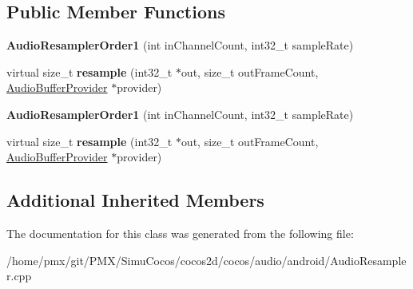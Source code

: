 \subsection*{Public Member Functions}
\begin{DoxyCompactItemize}
\item 
\mbox{\label{classcocos2d_1_1experimental_1_1AudioResamplerOrder1_ac1a9b64c01f4b74e204534d4a13f019b}} 
{\bfseries Audio\+Resampler\+Order1} (int in\+Channel\+Count, int32\+\_\+t sample\+Rate)
\item 
\mbox{\label{classcocos2d_1_1experimental_1_1AudioResamplerOrder1_a0524655e0598880221d63be29004db61}} 
virtual size\+\_\+t {\bfseries resample} (int32\+\_\+t $\ast$out, size\+\_\+t out\+Frame\+Count, \hyperlink{classcocos2d_1_1experimental_1_1AudioBufferProvider}{Audio\+Buffer\+Provider} $\ast$provider)
\item 
\mbox{\label{classcocos2d_1_1experimental_1_1AudioResamplerOrder1_ac1a9b64c01f4b74e204534d4a13f019b}} 
{\bfseries Audio\+Resampler\+Order1} (int in\+Channel\+Count, int32\+\_\+t sample\+Rate)
\item 
\mbox{\label{classcocos2d_1_1experimental_1_1AudioResamplerOrder1_a445c8e561330ffc453a8ab536ab9b3f1}} 
virtual size\+\_\+t {\bfseries resample} (int32\+\_\+t $\ast$out, size\+\_\+t out\+Frame\+Count, \hyperlink{classcocos2d_1_1experimental_1_1AudioBufferProvider}{Audio\+Buffer\+Provider} $\ast$provider)
\end{DoxyCompactItemize}
\subsection*{Additional Inherited Members}


The documentation for this class was generated from the following file\+:\begin{DoxyCompactItemize}
\item 
/home/pmx/git/\+P\+M\+X/\+Simu\+Cocos/cocos2d/cocos/audio/android/Audio\+Resampler.\+cpp\end{DoxyCompactItemize}
